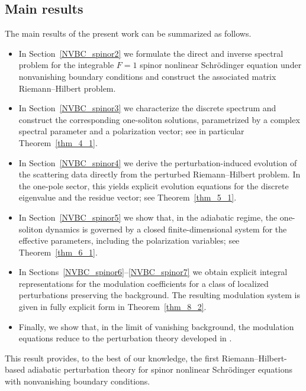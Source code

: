 \documentclass[11pt]{amsart}
\theoremstyle{definition}
\numberwithin{equation}{section}
\begin{document}
\subsection*{Main results}
The main results of the present work can be summarized as follows.

\begin{itemize}

\item[(i)] In Section~\ref{NVBC_spinor2} we formulate the direct and inverse spectral problem for the integrable $F=1$ spinor nonlinear Schr\"odinger equation under nonvanishing boundary conditions and construct the associated matrix Riemann--Hilbert problem.

\item[(ii)] In Section~\ref{NVBC_spinor3} we characterize the discrete spectrum and construct the corresponding one-soliton solutions, parametrized by a complex spectral parameter and a polarization vector; see in particular Theorem~\ref{thm_4_1}.

\item[(iii)] In Section~\ref{NVBC_spinor4} we derive the perturbation-induced evolution of the scattering data directly from the perturbed Riemann--Hilbert problem. In the one-pole sector, this yields explicit evolution equations for the discrete eigenvalue and the residue vector; see Theorem~\ref{thm_5_1}.

\item[(iv)] In Section~\ref{NVBC_spinor5} we show that, in the adiabatic regime, the one-soliton dynamics is governed by a closed finite-dimensional system for the effective parameters, including the polarization variables; see Theorem~\ref{thm_6_1}.

\item[(v)] In Sections~\ref{NVBC_spinor6}--\ref{NVBC_spinor7} we obtain explicit integral representations for the modulation coefficients for a class of localized perturbations preserving the background. The resulting modulation system is given in fully explicit form in Theorem~\ref{thm_8_2}.

\item[(vi)] Finally, we show that, in the limit of vanishing background, the modulation equations reduce to the perturbation theory developed in \cite{Doktorov2008}.

\end{itemize}

This result provides, to the best of our knowledge, the first Riemann--Hilbert-based adiabatic perturbation theory for spinor nonlinear Schr\"odinger equations with nonvanishing boundary conditions.
\end{document}
